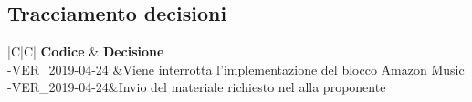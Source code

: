 \documentclass[a4paper,12pt]{article}
\begin{document}
	\newpage
	\subsection{Tracciamento decisioni}
	\begin{table}[tbph]
		\centering
		\begin{tabularx}{\textwidth}{|C|C|}
			\hline
			\textbf{Codice } & \textbf{Decisione} \\
			-VER\_2019-04-24 &Viene interrotta l'implementazione del blocco Amazon Music \\
			-VER\_2019-04-24&Invio del materiale richiesto nel alla proponente \\
			\hline
		\end{tabularx}
		\caption{Tracciamento decisioni}
	\end{table}
	\label{LastPage}
\end{document}
